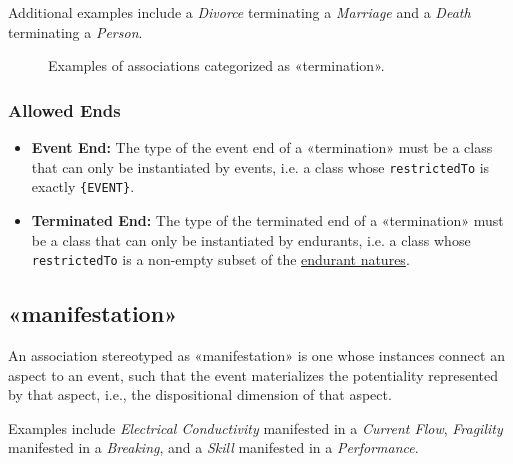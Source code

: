 Additional examples include a \textit{Divorce} terminating a \textit{Marriage} and a \textit{Death} terminating a \textit{Person}.

\begin{figure}[h]
    \centering
    
    \caption{Examples of associations categorized as «termination».}
    \label{fig:termination-example}
\end{figure}


\subsubsection{Allowed Ends}

\begin{itemize}
    \item \textbf{Event End:} The type of the event end of a «termination» must be a class that can only be instantiated by events, i.e. a class whose \texttt{restrictedTo} is exactly \texttt{\{EVENT\}}.
    \item \textbf{Terminated End:} The type of the terminated end of a «termination» must be a class that can only be instantiated by endurants, i.e. a class whose \texttt{restrictedTo} is a non-empty subset of the \hyperref[par:endurant-nature]{endurant natures}.
\end{itemize}




\subsection{«manifestation»}
\label{stereotype:manifestation}

An association stereotyped as «manifestation» is one whose instances connect an aspect to an event, such that the event materializes the potentiality represented by that aspect, i.e., the dispositional dimension of that aspect.


Examples include \textit{Electrical Conductivity} manifested in a \textit{Current Flow}, \textit{Fragility} manifested in a \textit{Breaking}, and a \textit{Skill} manifested in a \textit{Performance}.


